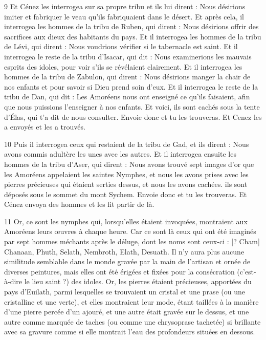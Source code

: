 \par 9 Et Cénez les interrogea sur sa propre tribu et ils lui dirent : Nous désirions imiter et fabriquer le veau qu'ils fabriquaient dans le désert. Et après cela, il interrogea les hommes de la tribu de Ruben, qui dirent : Nous désirions offrir des sacrifices aux dieux des habitants du pays. Et il interrogea les hommes de la tribu de Lévi, qui dirent : Nous voudrions vérifier si le tabernacle est saint. Et il interrogea le reste de la tribu d'Isacar, qui dit : Nous examinerions les mauvais esprits des idoles, pour voir s'ils se révélaient clairement. Et il interrogea les hommes de la tribu de Zabulon, qui dirent : Nous désirions manger la chair de nos enfants et pour savoir si Dieu prend soin d'eux. Et il interrogea le reste de la tribu de Dan, qui dit : Les Amoréens nous ont enseigné ce qu'ils faisaient, afin que nous puissions l'enseigner à nos enfants. Et voici, ils sont cachés sous la tente d'Élas, qui t'a dit de nous consulter. Envoie donc et tu les trouveras. Et Cenez les a envoyés et les a trouvés.

\par 10 Puis il interrogea ceux qui restaient de la tribu de Gad, et ils dirent : Nous avons commis adultère les unes avec les autres. Et il interrogea ensuite les hommes de la tribu d'Aser, qui dirent : Nous avons trouvé sept images d'or que les Amoréens appelaient les saintes Nymphes, et nous les avons prises avec les pierres précieuses qui étaient serties dessus, et nous les avons cachées. ils sont déposés sous le sommet du mont Sychem. Envoie donc et tu les trouveras. Et Cénez envoya des hommes et les fit partir de là.

\par 11 Or, ce sont les nymphes qui, lorsqu'elles étaient invoquées, montraient aux Amoréens leurs œuvres à chaque heure. Car ce sont là ceux qui ont été imaginés par sept hommes méchants après le déluge, dont les noms sont ceux-ci : [? Cham] Chanaan, Phuth, Selath, Nembroth, Elath, Desuath. Il n'y aura plus aucune similitude semblable dans le monde gravée par la main de l'artisan et ornée de diverses peintures, mais elles ont été érigées et fixées pour la consécration (c'est-à-dire le lieu saint ?) des idoles. Or, les pierres étaient précieuses, apportées du pays d'Euilath, parmi lesquelles se trouvaient un cristal et une prase (ou une cristalline et une verte), et elles montraient leur mode, étant taillées à la manière d'une pierre percée d'un ajouré, et une autre était gravée sur le dessus, et une autre comme marquée de taches (ou comme une chrysoprase tachetée) si brillante avec sa gravure comme si elle montrait l'eau des profondeurs situées en dessous.

